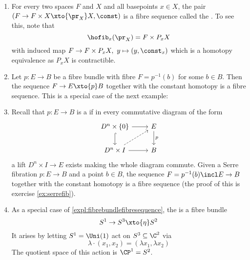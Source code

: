 \documentclass[wip, topology]{bsteffan-lecturenotes}
\begin{document}
\begin{example}
	\leavevmode
	\begin{enumerate}[resume]
		\item For every two spaces $F$ and $X$ and all basepoints $x \in X$, the pair $(F \to F \times X \xto{\pr_X} X, \const)$ is a fibre sequence called the .
			To see this, note that
			\begin{equation*}
				\hofib_x(\pr_X) = F \times P_x X
			\end{equation*}
			with induced map $F \to F \times P_x X,\ y \mapsto (y, \const_x)$ which is a homotopy equivalence as $P_x X$ is contractible.
		\item\label{expl:fibrebundlefibresequence} Let $p\colon E \to B$ be a fibre bundle with fibre $F = p^{-1}(b)$ for some $b \in B$.
			Then the sequence $F \to E \xto{p} B$ together with the constant homotopy is a fibre sequence.
			This is a special case of the next example:
		\item Recall that $p\colon E \to B$ is a  if in every commutative diagram of the form
			\begin{equation*}
				\begin{tikzcd}
					D^n \times \{0\}
							\ar[r]
							\ar[d, hook]
						& E
							\ar[d, "p"]
					\\
					D^n \times I
							\ar[r]
							\ar[ur, dashed]
						& B
				\end{tikzcd}
			\end{equation*}
			a lift $D^n \times I \to E$ exists making the whole diagram commute.
			Given a Serre fibration $p\colon E \to B$ and a point $b \in B$, the sequence $F = p^{-1}(b) \incl E \to B$ together with the constant homotopy is a fibre sequence (the proof of this is exercise \ref{ex:serrefib}).
		\item\label{expl:hopfbundle} As a special case of \ref{expl:fibrebundlefibresequence}, the  is a fibre bundle
			\begin{equation*}
				S^1 \to S^3 \xto{\eta} S^2
			\end{equation*}
			It arises by letting $S^1 = \Uni(1)$ act on $S^3 \subseteq \C^2$ via
			\begin{equation*}
				\lambda \cdot (x_1, x_2) = (\lambda x_1, \lambda x_2)
			\end{equation*}
			The quotient space of this action is $\CP^1 = S^2$.

\end{enumerate}
\end{example}
\end{document}
